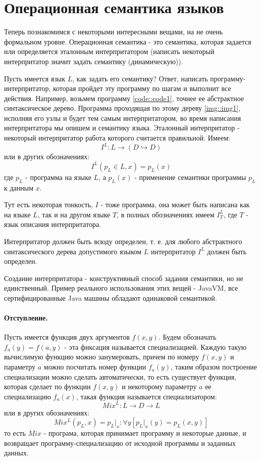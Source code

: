 \section{Операционная семантика языков}

Теперь познакомимся с некоторыми интересными вещами, на не очень формальном уровне. Операционная семантика - это семантика, которая задается или определяется
эталонным интерпритатором (написать некоторый интерпритатор значит задать семантику (динамическую)).

Пусть имеется язык $L$, как задать его семантику? Ответ, написать программу-интерпритатор, которая пройдет эту программу по шагам и выполнит все действия.
Например, возьмем программу \ref{code::code1}, точнее ее абстрактное синтаксическое дерево. Программа проходящая по этому дереву \ref{img::img1},
исполняя его узлы и будет тем самым интерпритатором, во время написания интерпритатора мы опишем и семантику языка. Эталонный интерпритатор - некоторый
интерпритатор работа которого считается правильной. Имеем: $$ I^L : L \rightarrow \left(D \hookrightarrow D\right) $$ или в других обозначениях:
$$ I^L \left(p_L \in L, x\right) = p_L\left(x\right) $$
где $p_L$ - программа на языке $L$, а $p_L(x)$ - применение семантики программы $p_L$ к данным $x$.

Тут есть некоторая тонкость, $I$ - тоже программа, она может быть написана как на языке $L$, так и на другом языке $T$, в полных обозначениях имеем $I^L_T$, где
$T$ - язык описания интерпритатора.

Интерпритатор должен быть всюду определен, т. е. для любого абстрактного синтаксического дерева допустимого языком $L$ интерпритатор $I^L$ должен быть определен.

Создание интерпритатора - конструктивный способ задания семантики, но не единственный. Пример реального использования этих вещей - JavaVM, все сертифицированные
Java машины обладают одинаковой семантикой.

\paragraph{Отступление.} Пусть имеется функция двух аргументов $f\left(x,y\right)$. Будем обозначать $f_a\left(y\right) = f\left(a,y\right)$ - эта фиксация
называется специализацией. Каждую такую вычислимую функцию можно занумеровать, причем по номеру $f\left(x,y\right)$ и параметру $a$ можно посчитать номер функции
$f_a\left(y\right)$, таким образом построение специализации можно сделать автоматически, то есть существует функция, которая сделает по функции $f\left(x,y\right)$
и некоторому параметру $a$ ее специализацию $f_a\left(x\right)$, такая функция называется специализатором: $$ Mix^L : L \rightarrow D \rightarrow L $$ или в других
обозначениях: $$ Mix^L\left(p_L, x\right) = p_L |_x : \forall y \left[p_L|_x \left(y\right) = p_L\left(x,y\right) \right] $$ то есть $Mix$ - програма, которая
принимает программу и некоторые данные, и возвращает программу-специализацию от исходной программы и заданных данных.

